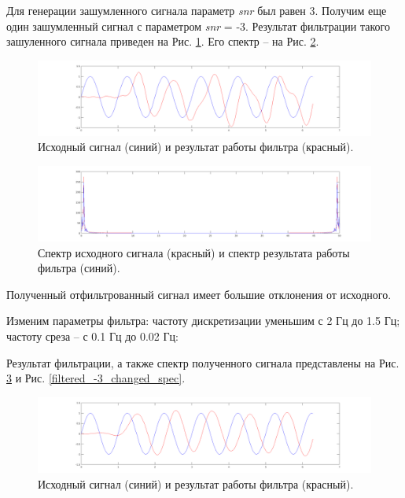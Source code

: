 \documentclass[a4paper,14pt]{extarticle}
\begin{document}
Для генерации зашумленного сигнала параметр \textit{snr} был равен 3. Получим еще один зашумленный сигнал с параметром \textit{snr} = -3. Результат фильтрации такого зашуленного сигнала приведен на Рис. \ref{filtered_-3}. Его спектр -- на Рис. \ref{filtered_-3_spec}.

\begin{figure}[H]
\centering
\includegraphics[scale=0.38]{pics/3filtered_-3.png} 
\caption{Исходный сигнал (синий) и результат работы фильтра (красный).}
\label{filtered_-3}
\end{figure}

\begin{figure}[H]
\centering
\includegraphics[scale=0.38]{pics/3filtered_-3_spec.png} 
\caption{Спектр исходного сигнала (красный) и спектр результата работы фильтра (синий).}
\label{filtered_-3_spec}
\end{figure}

Полученный отфильтрованный сигнал имеет большие отклонения от исходного.

Изменим параметры фильтра: частоту дискретизации уменьшим с 2 Гц до 1.5 Гц; частоту среза -- с 0.1 Гц до 0.02 Гц:

Результат фильтрации, а также спектр полученного сигнала представлены на Рис. \ref{filtered_-3_changed} и Рис. \ref{filtered_-3_changed_spec}.

\begin{figure}[H]
\centering
\includegraphics[scale=0.38]{pics/3filtered_-3_changed.png} 
\caption{Исходный сигнал (синий) и результат работы фильтра (красный).}
\label{filtered_-3_changed}
\end{figure}
\end{document}
